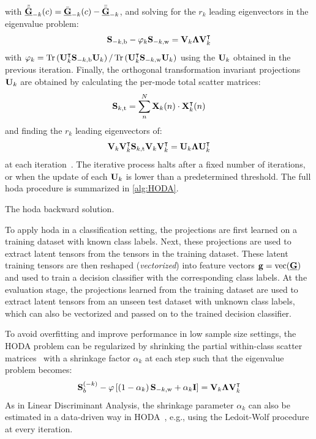 with $\tilde{\bar{\underline{\mathbf{G}}}}_{-k}(c) = \bar{\underline{\mathbf{G}}}_{-k}(c) - \bar{\bar{\underline{\mathbf{G}}}}_{-k}$,
and solving for the $r_k$ leading eigenvectors in the eigenvalue problem:
\begin{equation}
	\mathbf{S}_{-k,\text{b}}-\varphi_k\mathbf{S}_{-k,\text{w}} =
	\mathbf{V}_k\mathbf{\Lambda}\mathbf{V}_k^\intercal
\end{equation}
with $\varphi_k=\operatorname{Tr}\left(\mathbf{U}_k^\intercal\mathbf{S}_{-k,\text{b}}\mathbf{U}_k\right)/\operatorname{Tr}\left(\mathbf{U}_k^\intercal\mathbf{S}_{-k,\text{w}}\mathbf{U}_k\right)$
using the $\mathbf{U}_k$ obtained in the previous iteration.
Finally, the orthogonal transformation invariant projections $\mathbf{U}_k$
are obtained by calculating the
per-mode total scatter matrices:
\begin{equation}
  \mathbf{S}_{k,\text{t}} = \sum_n^N\mathbf{X}_k(n)\cdot\mathbf{X}_k^\intercal(n)
\end{equation}
and finding the $r_k$ leading eigenvectors of:
\begin{equation}
	\mathbf{V}_k\mathbf{V}_k^\intercal\mathbf{S}_{k,\text{t}}\mathbf{V}_k\mathbf{V}_k^\intercal
	= \mathbf{U}_k\mathbf{\Lambda}\mathbf{U}_k^\intercal
\end{equation}
at each iteration~\cite{Wang2007}.
The iterative process halts after a fixed number of iterations, or when the
update of each $\mathbf{U}_k$ is lower than a predetermined threshold.
The full \ac{hoda} procedure is summarized in \cref{alg:HODA}.
\begin{algorithm}
  \caption[A \acs{hoda} backward solution.]{The \acs{hoda} backward solution.}
	\label{alg:HODA}
	
\end{algorithm}

To apply \ac{hoda} in a classification setting, the projections
are first learned on a training dataset with known class labels.
Next, these projections are used to extract latent tensors from the
tensors in the training dataset.
These latent training tensors are then reshaped (\emph{vectorized}) into feature vectors
$\mathbf{g} =  \operatorname{vec}(\underline{\mathbf{G}})$ and used to train a decision classifier with the corresponding class labels.
At the evaluation stage, the projections learned from the training dataset are
used to extract latent tensors from an unseen test dataset with unknown class
labels, which can also be vectorized and passed on to the trained decision
classifier.

To avoid overfitting and improve performance in low sample size settings, the
HODA problem can be regularized by shrinking the partial
within-class scatter matrices~\cite{Phan2010} with a shrinkage factor
$\alpha_k$ at each step such that the eigenvalue problem becomes:
\begin{equation}
	\mathbf{S}_b^{(-k)} -
	\varphi\left[\left(1-\alpha_k\right)\mathbf{S}_{-k,\text{w}}+\alpha_k\mathbf{I}\right] =
	\mathbf{V}_k\mathbf{\Lambda}\mathbf{V}_k^\intercal
\end{equation}
As in Linear Discriminant Analysis, the shrinkage parameter $\alpha_k$ can
also be estimated in a data-driven way in HODA~\cite{Jorajuria2022},
e.g., using the Ledoit-Wolf procedure~\cite{Ledoit2003} at every iteration.

